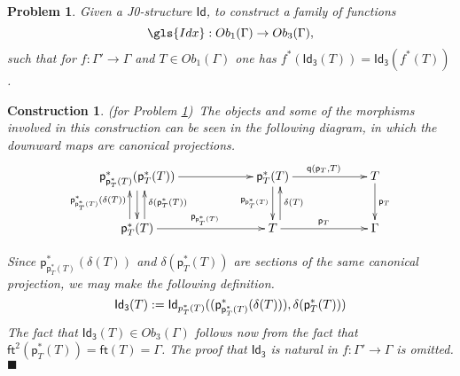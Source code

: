 \documentclass[12pt]{article}
\numberwithin{equation}{section}
\newenvironment{eq}{\begin{equation}}{\end{equation}}
\newtheorem{problem}[proposition]{Problem}
\newtheorem{construction0}[proposition]{Construction}
\newenvironment{construction}[1]{\begin{construction0}(for Problem \ref{#1})\ }{$\blacksquare$ \end{construction0}}
\newcommand{\llabel}[1]{\label{#1}}
\newcommand{\sr}{\rightarrow}
\newcommand{\ft}{\mathsf{ft}}
\newcommand{\p}{\mathsf{p}}
\newcommand{\q}{\mathsf{q}}
\newcommand{\Id}{\mathsf{Id}} %
\newcommand{\Idx}{\mathsf{Id_3}} %
\begin{document}
%
\begin{problem}
\llabel{2015.03.27.prob1} Given a J0-structure $\Id$, to construct a family of
functions
%
$$\gls{Idx}:Ob_1(\Gamma)\sr Ob_3(\Gamma),$$
%
such that for $f:\Gamma'\sr \Gamma$ and $T\in Ob_1(\Gamma)$ one has
$f^*(\Idx(T))=\Idx(f^*(T))$.
\end{problem}
%
\begin{construction}{2015.03.27.prob1}\llabel{2015.03.27.constr1}\rm
The objects and some of the morphisms involved
in this construction can be seen in the following diagram, in which the
downward maps are canonical projections.
%
\begin{eq}
  \begin{xy}
    \xymatrix@C=5pc{
      \p_{\p_T^*(T)}^*(\p_T^*(T)) \ar[r] \ar[d]                             &
      \p_T^*(T) \ar[r]^{\q(\p_T,T)} \ar[d]_{\p_{\p_T^*(T)}}                     &
      T \ar[d]^{\p_T}                                                      \\
      \p_T^*(T) \ar[r]^{\p_{\p_T^*(T)}}
                \ar@<-6pt>[u]_{\delta(\p_T^*(T))} 
                \ar@<6pt> [u]^{\p_{\p_T^*(T)}^*(\delta(T))}
                                                                         &
      T \ar[r]^{\p_T} \ar@<-6pt>[u]_{\delta(T)}                             &
      \Gamma
    }
  \end{xy}
\end{eq}%

Since $\p_{\p_T^*(T)}^*(\delta(T))$ and $\delta(\p_T^*(T))$ are sections of the
same canonical projection, we may make the following definition.
\begin{eq}
\llabel{2015.04.06.eq1}
\Idx(T):=\Id_{\\p_T^*(T)}((\p_{\p_T^*(T)}^*(\delta(T))), \delta(\p_T^*(T)))
\end{eq}%
The fact that $\Idx(T)\in Ob_3(\Gamma)$ follows now from the fact that
$\ft^2(\p_T^*(T))=\ft(T)=\Gamma$.
The proof that $\Idx$ is natural in $f:\Gamma'\sr \Gamma$ is omitted.
\end{construction}
\end{document}
